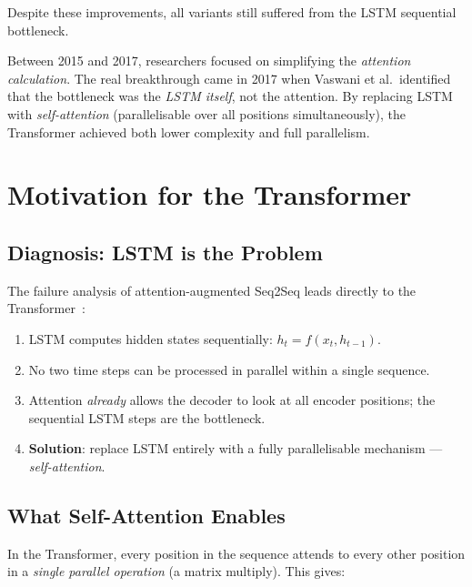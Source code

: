 \documentclass[12pt,a4paper]{article}
\begin{document}
Despite these improvements, all variants still suffered from the
LSTM sequential bottleneck.

\begin{keyinsight}[title=The True Bottleneck]
  Between 2015 and 2017, researchers focused on simplifying the
  \emph{attention calculation}.  The real breakthrough came in 2017
  when Vaswani et al.\ identified that the bottleneck was the
  \emph{LSTM itself}, not the attention.  By replacing LSTM with
  \emph{self-attention} (parallelisable over all positions
  simultaneously), the Transformer achieved both lower complexity and
  full parallelism.
\end{keyinsight}

\section{Motivation for the Transformer}
\label{sec:transformer}

\subsection{Diagnosis: LSTM is the Problem}

The failure analysis of attention-augmented Seq2Seq leads directly to
the Transformer~\cite{vaswani2017}:

\begin{enumerate}[label=\arabic*.]
  \item LSTM computes hidden states sequentially: $h_t = f(x_t, h_{t-1})$.
  \item No two time steps can be processed in parallel within a
        single sequence.
  \item Attention \emph{already} allows the decoder to look at all
        encoder positions; the sequential LSTM steps are the
        bottleneck.
  \item \textbf{Solution}: replace LSTM entirely with a fully
        parallelisable mechanism --- \emph{self-attention}.
\end{enumerate}

\subsection{What Self-Attention Enables}

In the Transformer, every position in the sequence attends to every
other position in a \emph{single parallel operation} (a matrix
multiply).  This gives:
\end{document}

